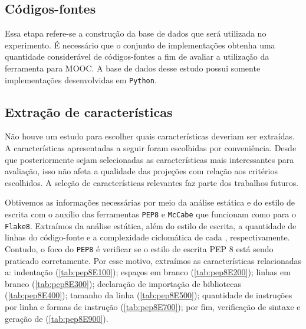 		\subsection{Códigos-fontes}	
			Essa etapa refere-se a construção da base de dados que será utilizada no experimento.
			É necessário que o conjunto de implementações obtenha uma quantidade considerável de
			códigos-fontes a fim de avaliar a utilização da ferramenta para \acs{MOOC}. A
			base de dados desse estudo possui somente implementações desenvolvidas em \texttt{Python}.
			
		\subsection{Extração de características} %
			Não houve um estudo para escolher quais características deveriam ser extraídas.
			A características apresentadas a seguir foram escolhidas por conveniência.
			Desde que posteriormente sejam selecionadas as características mais interessantes
			para avaliação, isso não afeta a qualidade das projeções com relação aos
			critérios escolhidos. A seleção de características relevantes faz parte dos
			trabalhos futuros.
			
			Obtivemos as informações necessárias por meio da análise estática e do estilo de   
			escrita com o auxílio das ferramentas \texttt{PEP8} \cite{pep8} e \texttt{McCabe}
			\cite{mccabe} que funcionam como  para o \texttt{Flake8}.
			Extraímos da análise estática, além do estilo de escrita, a quantidade de linhas do código-fonte e a complexidade ciclomática de cada , respectivamente. Contudo, o
			foco do \texttt{PEP8} é verificar se o estilo de escrita PEP 8 \cite{van2001pep}
			está sendo praticado corretamente. Por esse motivo, extraímos as características
			relacionadas a: indentação (\cref{tab:pep8E100}); espaços em branco
			(\cref{tab:pep8E200}); linhas em branco (\cref{tab:pep8E300}); declaração de
			importação de bibliotecas (\cref{tab:pep8E400}); tamanho da linha (\cref{tab:pep8E500});
			quantidade de instruções por linha e formas de instrução (\cref{tab:pep8E700}); por fim,
			verificação de sintaxe e geração de  (\cref{tab:pep8E900}).
		
